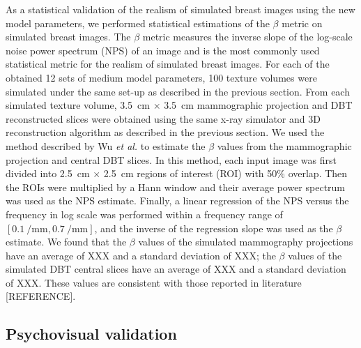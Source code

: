 \documentclass[journal]{IEEEtran}
\begin{document}
As a statistical validation of the realism of simulated breast images
using the new model parameters, we performed statistical estimations
of the $\beta$ metric on simulated breast images. The $\beta$ metric
measures the inverse slope of the log-scale noise power spectrum (NPS)
of an image and is the most commonly used statistical metric for the
realism of simulated breast images. For each of the obtained 12 sets
of medium model parameters, 100 texture volumes were simulated under
the same set-up as described in the previous section. From each
simulated texture volume, \SI{3.5}{\cm} $\times$ \SI{3.5}{\cm}
mammographic projection and DBT reconstructed slices were obtained
using the same x-ray simulator and 3D reconstruction algorithm as
described in the previous section. We used the method described by Wu
\textit{et al.} \cite{wu2012spectral} to estimate the $\beta$ values
from the mammographic projection and central DBT slices. In this
method, each input image was first divided into \SI{2.5}{\cm} $\times$
\SI{2.5}{\cm} regions of interest (ROI) with 50\% overlap. Then the
ROIs were multiplied by a Hann window and their average power spectrum
was used as the NPS estimate. Finally, a linear regression of the NPS
versus the frequency in log scale was performed within a frequency
range of $\left[ \SI{0.1}{\per\mm}, \SI{0.7}{\per\mm} \right]$, and
the inverse of the regression slope was used as the $\beta$
estimate. We found that the $\beta$ values of the simulated
mammography projections have an average of XXX and a standard
deviation of XXX; the $\beta$ values of the simulated DBT central
slices have an average of XXX and a standard deviation of XXX. These
values are consistent with those reported in literature [REFERENCE].

\subsection{Psychovisual validation}
\label{sec:psych-valid-valid}
\end{document}
